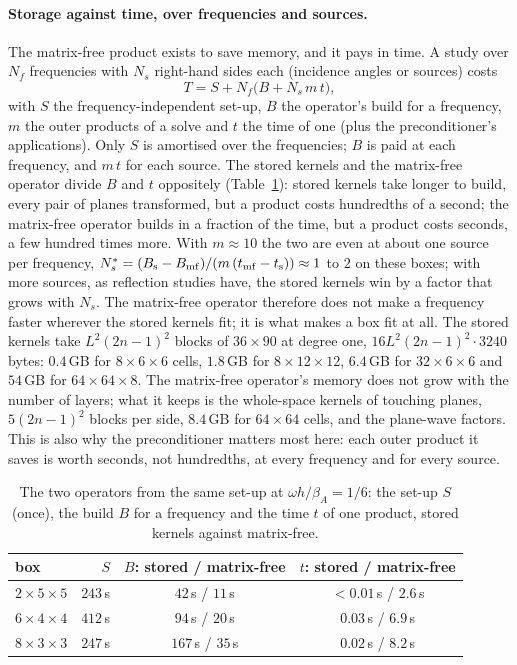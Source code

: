 \documentclass[11pt,a4paper]{article}
\begin{document}
\paragraph{Storage against time, over frequencies and sources.} The matrix-free product exists to save memory,
and it pays in time. A study over $N_f$ frequencies with $N_s$ right-hand sides each (incidence angles or
sources) costs
\begin{equation}\label{eq:costmodel}
  T=S+N_f\bigl(B+N_s\,m\,t\bigr),
\end{equation}
with $S$ the frequency-independent set-up, $B$ the operator's build for a frequency, $m$ the outer products of a
solve and $t$ the time of one (plus the preconditioner's applications). Only $S$ is amortised over the
frequencies; $B$ is paid at each frequency, and $m\,t$ for each source. The stored kernels and the matrix-free
operator divide $B$ and $t$ oppositely (Table~\ref{tab:storagetime}): stored kernels take longer to build, every
pair of planes transformed, but a product costs hundredths of a second; the matrix-free operator builds in a
fraction of the time, but a product costs seconds, a few hundred times more. With $m\approx10$ the two are even at
about one source per frequency, $N_s^\ast=(B_{\rm s}-B_{\rm mf})/(m\,(t_{\rm mf}-t_{\rm s}))\approx1$ to $2$ on
these boxes; with more sources, as reflection studies have, the stored kernels win by a factor that grows with
$N_s$. The matrix-free operator therefore does not make a frequency faster wherever the stored kernels fit; it is
what makes a box fit at all. The stored kernels take $L^2(2n-1)^2$ blocks of $36\times90$ at degree one,
$16L^2(2n-1)^2\cdot3240$ bytes: $0.4$\,GB for $8\times6\times6$ cells, $1.8$\,GB for $8\times12\times12$,
$6.4$\,GB for $32\times6\times6$ and $54$\,GB for $64\times64\times8$. The matrix-free operator's memory does not
grow with the number of layers; what it keeps is the whole-space kernels of touching planes, $5(2n-1)^2$ blocks per
side, $8.4$\,GB for $64\times64$ cells, and the plane-wave factors. This is also
why the preconditioner matters most here: each outer product it saves is worth seconds, not hundredths, at
every frequency and for every source.

\begin{table}[htbp]
\centering
\caption{The two operators from the same set-up at $\omega h/\beta_A=1/6$: the set-up $S$ (once), the build $B$
for a frequency and the time $t$ of one product, stored kernels against matrix-free.}
\label{tab:storagetime}
\begin{tabular}{lrcc}
\toprule
box & $S$ & $B$: stored / matrix-free & $t$: stored / matrix-free \\
\midrule
$2\times5\times5$ & $243$\,s & $42$\,s / $11$\,s & $<0.01$\,s / $2.6$\,s \\
$6\times4\times4$ & $412$\,s & $94$\,s / $20$\,s & $0.03$\,s / $6.9$\,s \\
$8\times3\times3$ & $247$\,s & $167$\,s / $35$\,s & $0.02$\,s / $8.2$\,s \\
\bottomrule
\end{tabular}
\end{table}
\end{document}
